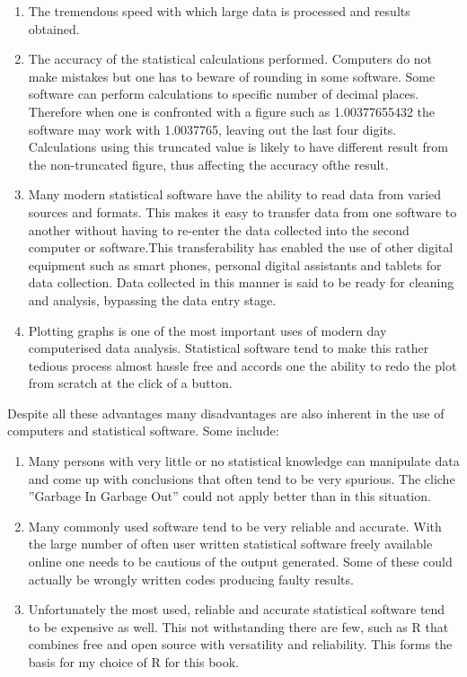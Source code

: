 \documentclass[
]{book}
\providecommand{\tightlist}{%
  \setlength{\itemsep}{0pt}\setlength{\parskip}{0pt}}
\theoremstyle{definition}
\theoremstyle{definition}
\theoremstyle{definition}
\theoremstyle{definition}
\theoremstyle{remark}
\begin{document}
\begin{enumerate}
\def\labelenumi{\arabic{enumi}.}
\tightlist
\item
  The tremendous speed with which large data is processed and results obtained.
\item
  The accuracy of the statistical calculations performed. Computers do not make mistakes but one has to beware of rounding in some software. Some software can perform calculations to specific number of decimal places. Therefore when one is
  confronted with a figure such as 1.00377655432 the software may work with
  1.0037765, leaving out the last four digits. Calculations using this truncated
  value is likely to have different result from the non-truncated figure, thus
  affecting the accuracy ofthe result.
\item
  Many modern statistical software have the ability to read data from varied
  sources and formats. This makes it easy to transfer data from one software to
  another without having to re-enter the data collected into the second computer
  or software.This transferability has enabled the use of other digital equipment such as smart phones, personal digital assistants and tablets for data collection. Data collected in this manner is said to be ready for cleaning and analysis, bypassing the data entry stage.
\item
  Plotting graphs is one of the most important uses of modern day computerised data analysis. Statistical software tend to make this rather tedious process almost hassle free and accords one the ability to redo the plot from scratch at the click of a button.
\end{enumerate}

Despite all these advantages many disadvantages are also inherent in the use of computers and statistical software. Some include:

\begin{enumerate}
\def\labelenumi{\arabic{enumi}.}
\tightlist
\item
  Many persons with very little or no statistical knowledge can manipulate data and come up with conclusions that often tend to be very spurious. The cliche ''Garbage In Garbage Out'' could not apply better than in this situation.
\item
  Many commonly used software tend to be very reliable and accurate. With the large number of often user written statistical software freely available online one needs to be cautious of the output generated. Some of these could actually be wrongly written codes producing faulty results.
\item
  Unfortunately the most used, reliable and accurate statistical software tend to be expensive as well. This not withstanding there are few, such as R that combines free and open source with versatility and reliability. This forms the basis for my choice of R for this book.
\end{enumerate}
\end{document}
